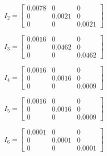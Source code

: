 \begin{equation}
I_{2} = 
\begin{bmatrix}
0.0078 & 0 & 0\\
0 & 0.0021 & 0\\
0 & 0 & 0.0021
\end{bmatrix}
\end{equation}

\begin{equation}
I_{3} = 
\begin{bmatrix}
0.0016 & 0 & 0\\
0 & 0.0462 & 0\\
0 & 0 & 0.0462
\end{bmatrix}
\end{equation}

\begin{equation}
I_{4} = 
\begin{bmatrix}
0.0016 & 0 & 0\\
0 & 0.0016 & 0\\
0 & 0 & 0.0009
\end{bmatrix}
\end{equation}

\begin{equation}
I_{5} = 
\begin{bmatrix}
0.0016 & 0 & 0\\
0 & 0.0016 & 0\\
0 & 0 & 0.0009
\end{bmatrix}
\end{equation}

\begin{equation}
I_{6} = 
\begin{bmatrix}
0.0001 & 0 & 0\\
0 & 0.0001 & 0\\
0 & 0 & 0.0001
\end{bmatrix}
\end{equation}


